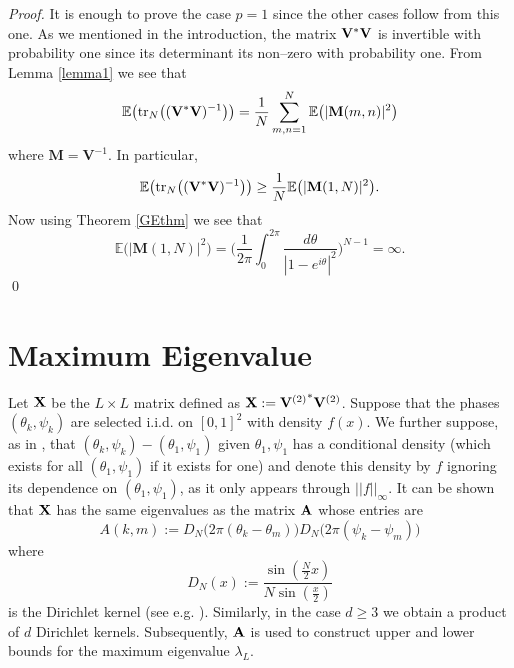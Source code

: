 \documentclass[smallextended]{svjour3}
\begin{document}
\begin{proof}  
It is enough to prove the case $p=1$ since the other cases follow from this one. As we mentioned in the introduction, the matrix ${\bf V^{*}}{\bf V}$ is invertible with probability one since its determinant its non--zero with probability one. From Lemma \ref{lemma1} we see that 
$$
\mathbb{E}\big(\mathrm{tr}_{N}\big(({\bf V^{*}}{\bf V})^{-1}\big)\big) = \frac{1}{N}\sum_{m,n=1}^{N}{\mathbb{E}\big( |\mathbf{M}(m,n)|^2\big)}
$$
where $\mathbf{M}=\mathbf{V}^{-1}$. In particular, 
$$
\mathbb{E}\big(\mathrm{tr}_{N}\big(({\bf V^{*}}{\bf V})^{-1}\big)\big) \geq \frac{1}{N}\mathbb{E}\big(|\mathbf{M}(1,N)|^2\big).
$$
Now using Theorem \ref{GEthm} we see that 
$$
\mathbb{E}\big(|\mathbf{M}(1,N)|^2\big)=\Bigg( \frac{1}{2\pi}\int_{0}^{2\pi}{\frac{d\theta}{|1-e^{i\theta}|^2}}\Bigg)^{N-1}=\infty.
$$
\qed \end{proof}

\section{Maximum Eigenvalue}\label{maxeig}

Let ${\bf X}$ be the $L\times L$ matrix defined as ${\bf X} := {{\bf V}^{(2)}}^{*} {\bf V}^{(2)}$. Suppose that the 
phases $(\theta_k,\psi_k)$ are selected i.i.d. on $[0,1]^2$ with density $f(x)$. We further suppose, as in \cite{TW}, that $(\theta_k,\psi_k) - (\theta_1,\psi_1)$ given $\theta_1,\psi_1$ has a conditional density (which exists for all  $(\theta_1,\psi_1)$ if it exists for one) and denote this density by 
$f$ ignoring its dependence on $(\theta_1,\psi_1)$, as it only appears through ${\lvert \lvert {f} \rvert \rvert_\infty}$. It can be shown that 
${\bf X}$ has the same eigenvalues as the matrix ${\bf A}$ whose entries are 
\begin{equation}\label{eqn_Amat}
A(k,m) := D_N\Big(2\pi(\theta_k - \theta_m)\Big) D_N\Big(2\pi(\psi_k - \psi_m)\Big)
\end{equation}
where 
$$
D_N(x) := 
            \frac{\sin(\frac{N}{2}x)}{N\sin(\frac{x}{2})} 
$$
is the Dirichlet kernel (see e.g. \cite{TW}). Similarly, in the case $d\geq 3$ we obtain a product of $d$ Dirichlet kernels. Subsequently, ${\bf A}$ is used to construct upper and lower bounds for the maximum eigenvalue
$\lambda_L$. 
\end{document}
